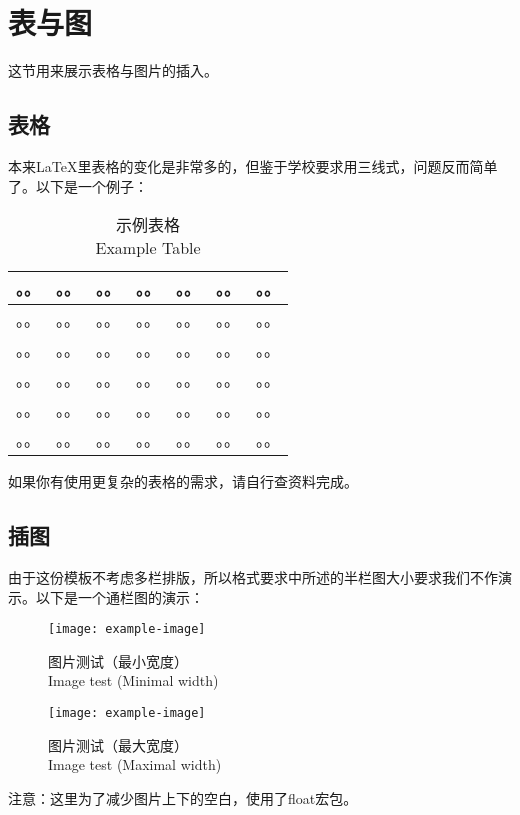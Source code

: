 \section{表与图}这节用来展示表格与图片的插入。

\subsection{表格}
\par 本来LaTeX里表格的变化是非常多的，但鉴于学校要求用三线式，问题反而简单了。以下是一个例子：
\begin{table}[htbp]\center
    \caption{示例表格\\Example Table}
    \begin{tabular}{lcccccl}
     \toprule
     。。 & 。。 & 。。 & 。。 & 。。& 。。 & 。。\\
     \midrule
    。。 & 。。 & 。。 & 。。 & 。。& 。。 & 。。\\
    。。 & 。。 & 。。 & 。。 & 。。& 。。 & 。。\\
    。。 & 。。 & 。。 & 。。 & 。。& 。。 & 。。\\
    。。 & 。。 & 。。 & 。。 & 。。& 。。 & 。。\\
    。。 & 。。 & 。。 & 。。 & 。。& 。。 & 。。\\
     \bottomrule
    \end{tabular}
   \end{table}
如果你有使用更复杂的表格的需求，请自行查资料完成。

\subsection{插图}
由于这份模板不考虑多栏排版，所以格式要求中所述的半栏图大小要求我们不作演示。以下是一个通栏图的演示：
\begin{figure}[H]
    \centering
    \texttt{[image: example-image]}
    \caption{图片测试（最小宽度）\\Image test (Minimal width)}
  \end{figure}

\begin{figure}[H]
    \centering
    \texttt{[image: example-image]}
    \caption{图片测试（最大宽度）\\Image test (Maximal width)}
\end{figure}
\par 注意：这里为了减少图片上下的空白，使用了float宏包。